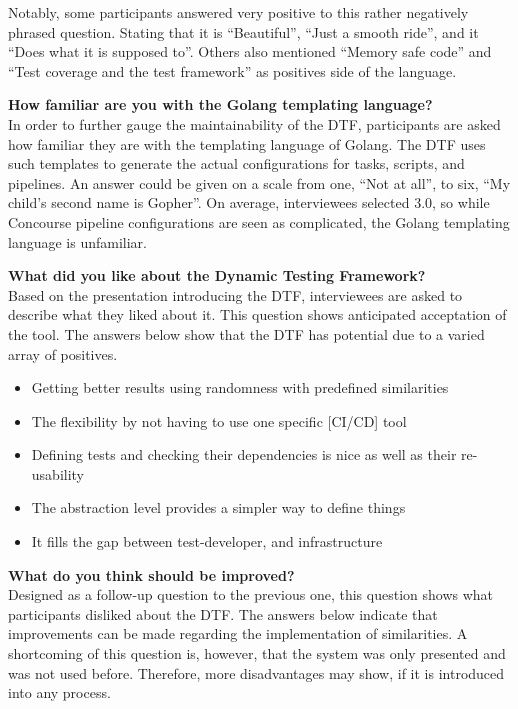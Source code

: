 Notably, some participants answered very positive to this rather negatively phrased question.
Stating that it is ``Beautiful'', ``Just a smooth ride'', and it ``Does what it is supposed to''.
Others also mentioned ``Memory safe code'' and ``Test coverage and the test framework'' as positives side of the language.

\textbf{How familiar are you with the Golang templating language?}\\
In order to further gauge the maintainability of the DTF, participants are asked how familiar they are with the templating language of Golang.
The DTF uses such templates to generate the actual configurations for tasks, scripts, and pipelines.
An answer could be given on a scale from one, ``Not at all'', to six, ``My child's second name is Gopher''.
On average, interviewees selected $3.0$, so while Concourse pipeline configurations are seen as complicated, the Golang templating language is unfamiliar.

\textbf{What did you like about the Dynamic Testing Framework?}\\
Based on the presentation introducing the DTF, interviewees are asked to describe what they liked about it.
This question shows anticipated acceptation of the tool.
The answers below show that the DTF has potential due to a varied array of positives.

\begin{itemize}
    \item Getting better results using randomness with predefined similarities
    \item The flexibility by not having to use one specific [CI/CD] tool
    \item Defining tests and checking their dependencies is nice as well as their re-usability
    \item The abstraction level provides a simpler way to define things
    \item It fills the gap between test-developer, and infrastructure
\end{itemize}

\textbf{What do you think should be improved?}\\
Designed as a follow-up question to the previous one, this question shows what participants disliked about the DTF.
The answers below indicate that improvements can be made regarding the implementation of similarities.
A shortcoming of this question is, however, that the system was only presented and was not used before.
Therefore, more disadvantages may show, if it is introduced into any process.

